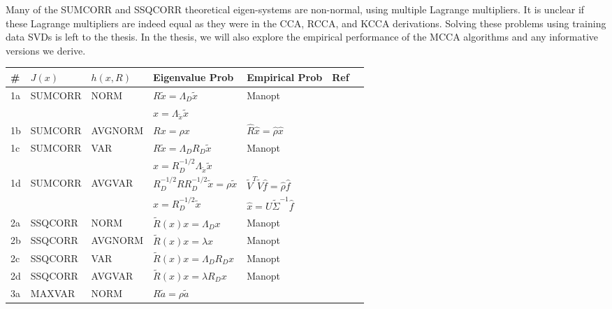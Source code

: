Many of the SUMCORR and SSQCORR theoretical eigen-systems are non-normal, using multiple
Lagrange multipliers. It is unclear if these Lagrange multipliers are indeed equal as they
were in the CCA, RCCA, and KCCA derivations. Solving these problems using training data
SVDs is left to the thesis. In the thesis, we will also explore the empirical performance
of the MCCA algorithms and any informative versions we derive. 

\begin{table*}[!h]
  \centering
  \begin{tabular}{lllllll}\toprule
    \# & $J(x)$ & $h(x,R)$  & Eigenvalue Prob & Empirical Prob & Ref\\
    \midrule
    1a & SUMCORR & NORM & $R \widetilde{x} = \Lambda_D\widetilde{x}$ & Manopt &
    \cite{nielsen2002multiset,nielsen1994analysis}\\ 
    &&&$x = \Lambda_{\widetilde{x}}\widetilde{x}$ &&\\
    1b & SUMCORR & AVGNORM & $R x = \rho x$ &
    $\widehat{R}\widehat{x} = \widehat{\rho}\widehat{x}$&
    \cite{nielsen1994analysis}\\ 
    1c & SUMCORR & VAR & $R\widetilde{x}=\Lambda_DR_D\widetilde{x}$  & Manopt&
    \cite{nielsen2002multiset,kettenring1971canonical,nielsen1994analysis}\\
    &&&$x = R_D^{-1/2}\Lambda_{\widetilde{x}}\widetilde{x}$&&\\
    1d & SUMCORR & AVGVAR &  $R_D^{-1/2}RR_D^{-1/2}\widetilde{x}=\rho\widetilde{x}$&
    $\widetilde{V}^T\widetilde{V}\widehat{f}=\widehat{\rho}\widehat{f}$ &
    \cite{deleus2011functional,nielsen2002multiset,via2005canonical}\\ 
    &&&$x=R_D^{-1/2}\widetilde{x}$&$\widehat{x}=U\widetilde{\Sigma}^{-1}\widehat{f}$&
    \cite{nielsen1994analysis,yu2007learning}\\  
    \midrule
    2a & SSQCORR & NORM & $\widetilde{R}(x)x = \Lambda_Dx$ & Manopt &
    \cite{nielsen1994analysis}\\  
    2b & SSQCORR & AVGNORM & $\widetilde{R}(x)x = \lambda x$ & Manopt &
    \cite{nielsen1994analysis}\\ 
    2c & SSQCORR & VAR & $\widetilde{R}(x)x= \Lambda_DR_Dx$ & Manopt &
    \cite{correa2010canonical,kettenring1971canonical,nielsen1994analysis}\\ 
    2d & SSQCORR & AVGVAR & $\widetilde{R}(x)x=\lambda R_Dx$ & Manopt&
    \cite{nielsen1994analysis}\\ 
    \midrule
    3a & MAXVAR & NORM & $R\tilde{a} = \rho\tilde{a}$ &

\end{tabular}
\end{table*}
